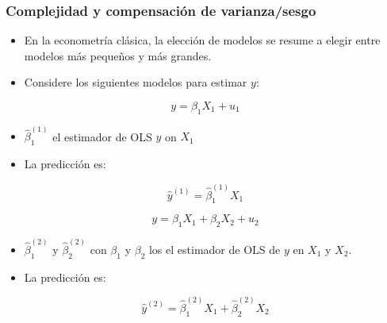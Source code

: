 \documentclass[
  shownotes,
  xcolor={svgnames},
  hyperref={colorlinks,citecolor=DarkBlue,linkcolor=DarkRed,urlcolor=DarkBlue}
  , aspectratio=169]{beamer}
\begin{document}
\begin{frame}
\frametitle{Complejidad y compensación de varianza/sesgo}

\begin{itemize}
\item En la econometría clásica, la elección de modelos se resume a elegir entre modelos más pequeños y más grandes.
\item Considere los siguientes modelos para estimar  $y$:

\end{itemize}



\begin{minipage}[t]{0.48\linewidth}

          \begin{equation} 
          y=\beta_1 X_1 + u_1 \nonumber
          \end{equation}
        \begin{itemize}
          \item $\hat \beta^{(1)}_1$ el estimador de OLS $y$ on $X_1$
          \medskip
          \item La predicción es:
        \end{itemize}
        \bigskip
          \begin{equation}\label{eq:3_2_3}
          \hat{y}^{(1)}=\hat{\beta}^{(1)}_1 X_1 \nonumber
          \end{equation}
    
    \end{minipage}
    \hfill
    \begin{minipage}[t]{0.48\linewidth}%
        

        \begin{equation}
          y=\beta_1 X_1 + \beta_2 X_2 + u_2 \nonumber
        \end{equation}
      \begin{itemize}
          \item  $\hat \beta^{(2)}_1$ y $\hat \beta^{(2)}_2$ con $\beta_1$ y $\beta_2$ los el estimador de OLS de $y$ en $X_1$ y $X_2$. 
          \item La predicción es:
      \end{itemize}

      \begin{equation}\label{eq:3_2_4}
      \hat{y}^{(2)}=\hat{\beta}^{(2)}_1 X_1 + \hat{\beta}^{(2)}_2 X_2  \nonumber
      \end{equation}

    \end{minipage}
 
\end{frame}
\end{document}
